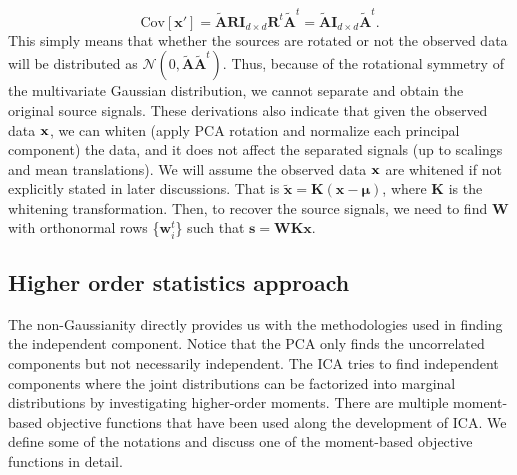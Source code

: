 \documentclass[aps,prl,preprint,superscriptaddress]{revtex4-2}
\begin{document}
\begin{equation}
\mathrm{Cov}[\mathbf{x'}] = \tilde{\mathbf{A}}\mathbf{R}\mathbf{I}_{d\times d}\mathbf{R}^{t}\tilde{\mathbf{A}}^{t} = \tilde{\mathbf{A}}\mathbf{I}_{d\times d}\tilde{\mathbf{A}}^{t}.
\end{equation} This simply means that whether the sources are rotated or not the observed data will be distributed as $\mathcal{N}(0, \tilde{\mathbf{A}}\tilde{\mathbf{A}}^{t})$. Thus, because of the rotational symmetry of the multivariate Gaussian distribution, we cannot separate and obtain the original source signals. These derivations also indicate that given the observed data $\bf{x}$, we can whiten (apply PCA rotation and normalize each principal component) the data, and it does not affect the separated signals (up to scalings and mean translations). We will assume the observed data $\bf{x}$ are whitened if not explicitly stated in later discussions. That is $\tilde{\mathbf{x}} = \mathbf{K}(\mathbf{x}-\bm{\mu})$, where $\mathbf{K}$ is the whitening transformation. Then, to recover the source signals, we need to find $\mathbf{W}$ with orthonormal rows \{$\mathbf{w}_{i}^{t}$\} such that $\mathbf{s} = \mathbf{W}\mathbf{K}\mathbf{x}$.

\subsection{Higher order statistics approach}

The non-Gaussianity directly provides us with the methodologies used in finding the independent component. Notice that the PCA only finds the uncorrelated components but not necessarily independent. The ICA tries to find independent components where the joint distributions can be factorized into marginal distributions by investigating higher-order moments. There are multiple moment-based objective functions that have been used along the development of ICA. We define some of the notations and discuss one of the moment-based objective functions in detail.
\end{document}
